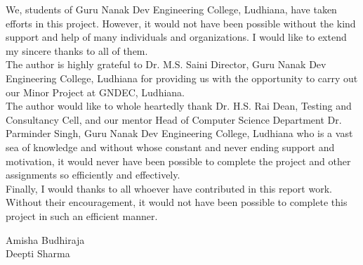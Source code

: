 
We, students of Guru Nanak Dev Engineering College, Ludhiana, have taken efforts in this project.
However, it would not have been possible without the kind support and help of many individuals
and organizations. I would like to extend my sincere thanks to all of them.\\

The author is highly grateful to Dr. M.S. Saini Director, Guru Nanak Dev Engineering College, Ludhiana for providing us with the opportunity to carry out our Minor Project at GNDEC, Ludhiana.\\

The author would like to whole heartedly thank Dr. H.S. Rai Dean, Testing and Consultancy
Cell, and our mentor Head of Computer Science Department Dr. Parminder Singh, Guru Nanak Dev Engineering College, Ludhiana who is a vast sea of knowledge and without whose constant and never ending support and motivation, it would never have been possible to complete the project and other assignments so efficiently and effectively.\\

Finally, I would thanks to all whoever have contributed in this report work. Without their encouragement, it would not have been possible
to complete this project in such an efficient manner.

\vskip 1.0cm 
\noindent Amisha Budhiraja\\
\noindent Deepti Sharma
